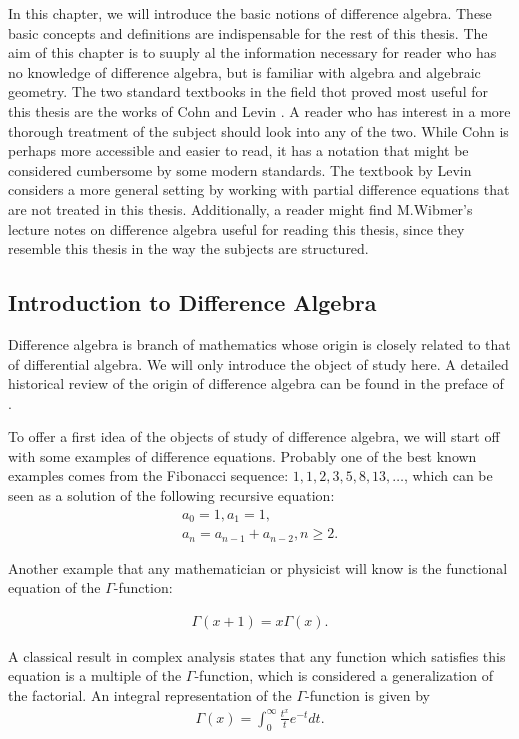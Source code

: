 In this chapter, we will introduce the basic notions of difference algebra. These basic concepts and definitions are indispensable for the rest of this thesis. 
The aim of this chapter is to suuply al the information necessary for reader who has no knowledge of difference algebra, but is familiar with algebra and algebraic geometry. 
The two standard textbooks in the field thot proved most useful for this thesis are the works of Cohn \cite{cohn} and Levin \cite{levin}. 
A reader who has interest in a more thorough treatment of the subject should look into any of the two. While Cohn is perhaps more accessible and easier to read, 
it has a notation that might be considered cumbersome by some modern standards. The textbook by Levin considers a more general setting by working with partial difference equations that are not treated in this thesis.
Additionally, a reader might find M.Wibmer's lecture notes on difference algebra \cite{wibmer} useful for reading this thesis, since they resemble this thesis in the way the subjects are structured.

\subsection{Introduction to Difference Algebra} 


Difference algebra is branch of mathematics whose origin is closely related to that of differential algebra. 
We will only introduce the object of study here. A detailed historical review of the origin of difference algebra can be found in the preface of \cite{levin}. 

To offer a first idea of the objects of study of difference algebra, we will start off with some examples of difference equations. Probably one of the best known examples comes from the Fibonacci sequence: $1,1,2,3,5,8,13,\ldots$, which can be seen as a solution of the following recursive equation:
\begin{align*}
a_0 = 1,  a_1 = 1, \\ a_n = a_{n-1} + a_{n-2}, n\geq 2.
\end{align*}

Another example that any mathematician or physicist will know is the functional equation of the $\Gamma$-function:

\begin{align*}
\Gamma(x+1) = x \Gamma(x).
\end{align*}

A classical result in complex analysis states that any function which satisfies this equation is a multiple of the $\Gamma$-function,
which is considered a generalization of the factorial. An integral representation of the $\Gamma$-function is given by
\begin{align*}
\Gamma(x) = \int_0^\infty{\frac{t^x}{t} e^{-t} dt}.
\end{align*}

